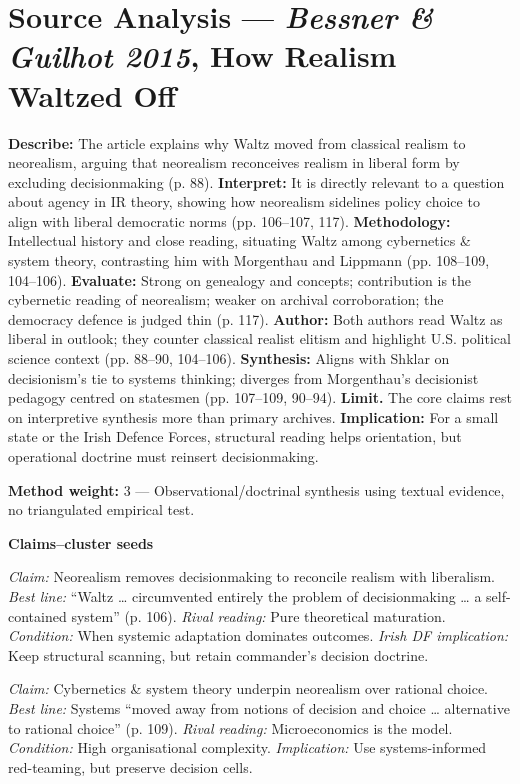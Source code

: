 \section*{Source Analysis — \textit{Bessner \& Guilhot 2015}, How Realism Waltzed Off}
\textbf{Describe:} The article explains why Waltz moved from classical realism to neorealism, arguing that neorealism reconceives realism in liberal form by excluding decisionmaking (p. 88).
\textbf{Interpret:} It is directly relevant to a question about agency in IR theory, showing how neorealism sidelines policy choice to align with liberal democratic norms (pp. 106–107, 117).
\textbf{Methodology:} Intellectual history and close reading, situating Waltz among cybernetics \& system theory, contrasting him with Morgenthau and Lippmann (pp. 108–109, 104–106).
\textbf{Evaluate:} Strong on genealogy and concepts; contribution is the cybernetic reading of neorealism; weaker on archival corroboration; the democracy defence is judged thin (p. 117).
\textbf{Author:} Both authors read Waltz as liberal in outlook; they counter classical realist elitism and highlight U.S. political science context (pp. 88–90, 104–106).
\textbf{Synthesis:} Aligns with Shklar on decisionism’s tie to systems thinking; diverges from Morgenthau’s decisionist pedagogy centred on statesmen (pp. 107–109, 90–94).
\textbf{Limit.} The core claims rest on interpretive synthesis more than primary archives.
\textbf{Implication:} For a small state or the Irish Defence Forces, structural reading helps orientation, but operational doctrine must reinsert decisionmaking.

\textbf{Method weight:} 3 — Observational/doctrinal synthesis using textual evidence, no triangulated empirical test.

\textbf{Claims–cluster seeds}

\textit{Claim:} Neorealism removes decisionmaking to reconcile realism with liberalism. \textit{Best line:} “Waltz … circumvented entirely the problem of decisionmaking … a self-contained system” (p. 106). \textit{Rival reading:} Pure theoretical maturation. \textit{Condition:} When systemic adaptation dominates outcomes. \textit{Irish DF implication:} Keep structural scanning, but retain commander’s decision doctrine.

\textit{Claim:} Cybernetics \& system theory underpin neorealism over rational choice. \textit{Best line:} Systems “moved away from notions of decision and choice … alternative to rational choice” (p. 109). \textit{Rival reading:} Microeconomics is the model. \textit{Condition:} High organisational complexity. \textit{Implication:} Use systems-informed red-teaming, but preserve decision cells.

